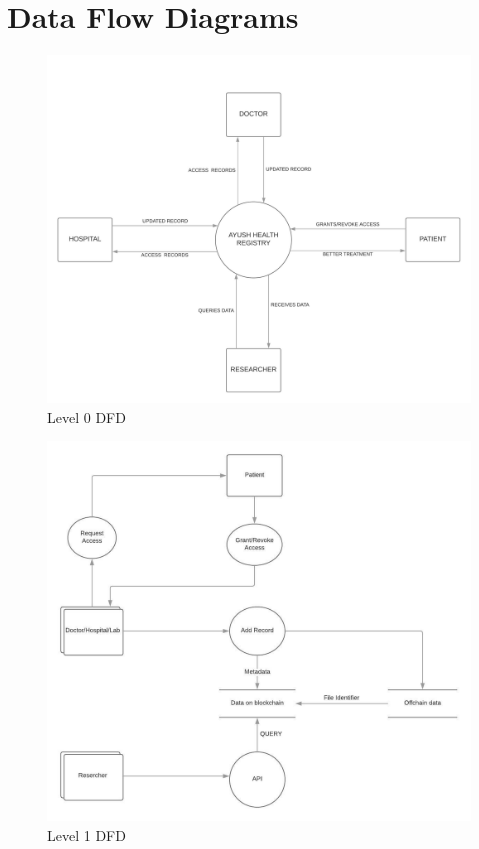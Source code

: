 \documentclass[11pt]{report}
\begin{document}
\section{Data Flow Diagrams}
    \begin{figure}[h!]
        \centering
        \includegraphics[scale=0.6]{DFD0.jpeg}
        \caption{Level 0 DFD}
        \label{fig:my_label}
    \end{figure}
    \begin{figure}[h!]
        \centering
        \includegraphics[scale=0.9]{DFD1.jpg}
        \caption{Level 1 DFD}
        \label{fig:my_label}
    \end{figure}
\end{document}
